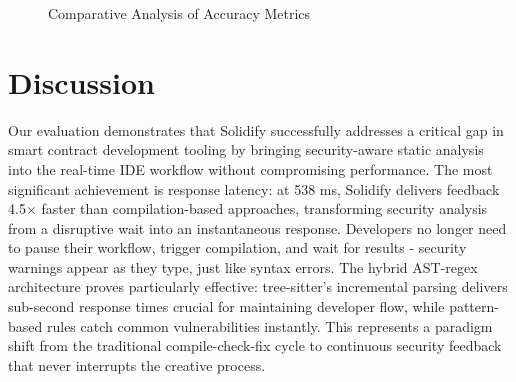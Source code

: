 \documentclass[10pt, a4paper]{article}
\begin{document}
\begin{figure}[H]
    \centering
    \caption{Comparative Analysis of Accuracy Metrics}
    \label{fig:accuracy_comparison}
\end{figure}

\section{Discussion}

Our evaluation demonstrates that Solidify successfully addresses a critical gap in smart contract development tooling by bringing security-aware static analysis into the real-time IDE workflow without compromising performance. The most significant achievement is response latency: at 538 ms, Solidify delivers feedback 4.5$\times$ faster than compilation-based approaches, transforming security analysis from a disruptive wait into an instantaneous response. Developers no longer need to pause their workflow, trigger compilation, and wait for results - security warnings appear as they type, just like syntax errors. The hybrid AST-regex architecture proves particularly effective: tree-sitter's incremental parsing delivers sub-second response times crucial for maintaining developer flow, while pattern-based rules catch common vulnerabilities instantly. This represents a paradigm shift from the traditional compile-check-fix cycle to continuous security feedback that never interrupts the creative process.
\end{document}
